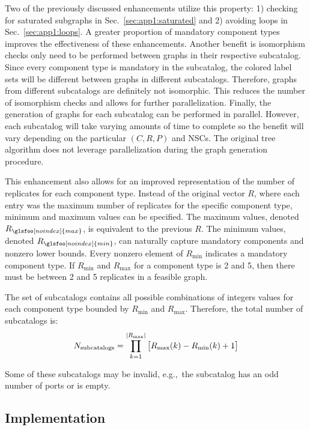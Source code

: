 Two of the previously discussed enhancements utilize this property: 1)
checking for saturated subgraphs in Sec.~\ref{sec:app1:saturated} and 2) avoiding loops in Sec.~\ref{sec:app1:loops}. A greater proportion of mandatory component types improves the effectiveness of these enhancements.
Another benefit is isomorphism checks only need to be performed between graphs in their respective subcatalog.
Since every component type is mandatory in the subcatalog, the colored label sets will be different between graphs in different subcatalogs.
Therefore, graphs from different subcatalogs are definitely not isomorphic. This reduces the number of isomorphism checks and allows for further parallelization.
Finally, the generation of graphs for each subcatalog can be performed in parallel. However, each subcatalog will take varying amounts of time to complete so the benefit will vary depending on the particular $(C,R,P)$ and NSCs. 
The original tree algorithm does not leverage parallelization during the graph generation procedure.

This enhancement also allows for an improved representation of the number of replicates for each component type. Instead of the original vector $R$, where each entry was the maximum number of replicates for the specific component type, minimum and maximum values can be specified. The maximum values, denoted $R_{\glsfoo[noindex]{max}}$, is equivalent to the previous $R$. The minimum values, denoted $R_{\glsfoo[noindex]{min}}$, can naturally capture mandatory components and nonzero lower bounds. Every nonzero element of $R_{\min}$ indicates a mandatory component type. If $R_{\min}$ and $R_{\max}$ for a component type is 2 and 5, then there must be between 2 and 5 replicates in a feasible graph. 

The set of subcatalogs contains all possible combinations of integers values for each component type bounded by $R_{\min}$ and $R_{\max}$.
Therefore, the total number of subcatalogs is:
\begin{align}
N_{\text{subcatalogs}} = \prod_{k=1}^{\lvert R_{\max}\rvert} \big[ R_{\max}(k) - R_{\min}(k) + 1 \big]
\end{align}

\noindent Some of these subcatalogs may be invalid, e.g.,~the subcatalog has an odd number of ports or is empty.

\subsection{Implementation}

